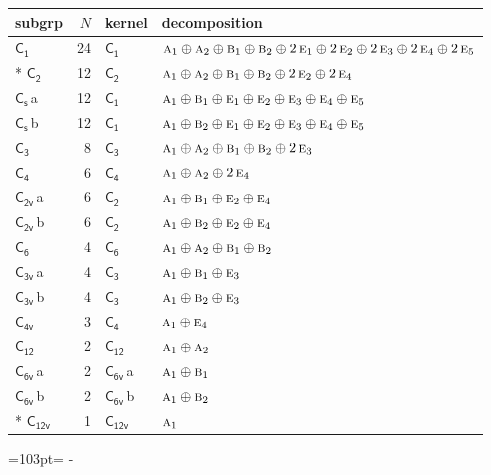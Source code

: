 \documentclass[10pt,a4paper]{article}
\newcommand{\needspace}[1]{\par\penalty-100\begingroup\dimen0=#1\relax\dimen2=\pagegoal
  \advance\dimen2-\pagetotal\ifdim\dimen0>\dimen2\relax\ifdim\dimen2>0pt\vfil\break\fi\fi
  \endgroup}
\numberwithin{equation}{section}
\newcommand{\grp}[1]{\mathsf{#1}}
\newcommand{\irr}[1]{\text{\normalfont\scshape #1}}
\newcommand{\clsletter}[1]{\,{\scriptsize\color{black!55}#1}}
\newlength{\fillwidth}\newlength{\cellwidth}\newlength{\colwidth}
\begin{document}
{\begin{longtable}{@{}lrl>{\RaggedRight\arraybackslash}p{\fillwidth}@{}}
subgrp & $N$ & kernel & decomposition\\\midrule\endhead
\bottomrule\endfoot\endlastfoot
\href{C1.pdf}{$\grp{C_{1}}$} & 24 & \href{C1.pdf}{$\grp{C_{1}}$} & $\irr{a}_{1}\oplus \irr{a}_{2}\oplus \irr{b}_{1}\oplus \irr{b}_{2}\oplus 2\,\irr{e}_{1}\oplus 2\,\irr{e}_{2}\oplus 2\,\irr{e}_{3}\oplus 2\,\irr{e}_{4}\oplus 2\,\irr{e}_{5}$\\*
\href{C2.pdf}{$\grp{C_{2}}$} & 12 & \href{C2.pdf}{$\grp{C_{2}}$} & $\irr{a}_{1}\oplus \irr{a}_{2}\oplus \irr{b}_{1}\oplus \irr{b}_{2}\oplus 2\,\irr{e}_{2}\oplus 2\,\irr{e}_{4}$\\
\href{C1v.pdf}{$\grp{C_{s}}$}\clsletter{a} & 12 & \href{C1.pdf}{$\grp{C_{1}}$} & $\irr{a}_{1}\oplus \irr{b}_{1}\oplus \irr{e}_{1}\oplus \irr{e}_{2}\oplus \irr{e}_{3}\oplus \irr{e}_{4}\oplus \irr{e}_{5}$\\
\href{C1v.pdf}{$\grp{C_{s}}$}\clsletter{b} & 12 & \href{C1.pdf}{$\grp{C_{1}}$} & $\irr{a}_{1}\oplus \irr{b}_{2}\oplus \irr{e}_{1}\oplus \irr{e}_{2}\oplus \irr{e}_{3}\oplus \irr{e}_{4}\oplus \irr{e}_{5}$\\
\href{C3.pdf}{$\grp{C_{3}}$} & 8 & \href{C3.pdf}{$\grp{C_{3}}$} & $\irr{a}_{1}\oplus \irr{a}_{2}\oplus \irr{b}_{1}\oplus \irr{b}_{2}\oplus 2\,\irr{e}_{3}$\\
\href{C4.pdf}{$\grp{C_{4}}$} & 6 & \href{C4.pdf}{$\grp{C_{4}}$} & $\irr{a}_{1}\oplus \irr{a}_{2}\oplus 2\,\irr{e}_{4}$\\
\href{C2v.pdf}{$\grp{C_{2v}}$}\clsletter{a} & 6 & \href{C2.pdf}{$\grp{C_{2}}$} & $\irr{a}_{1}\oplus \irr{b}_{1}\oplus \irr{e}_{2}\oplus \irr{e}_{4}$\\
\href{C2v.pdf}{$\grp{C_{2v}}$}\clsletter{b} & 6 & \href{C2.pdf}{$\grp{C_{2}}$} & $\irr{a}_{1}\oplus \irr{b}_{2}\oplus \irr{e}_{2}\oplus \irr{e}_{4}$\\
\href{C6.pdf}{$\grp{C_{6}}$} & 4 & \href{C6.pdf}{$\grp{C_{6}}$} & $\irr{a}_{1}\oplus \irr{a}_{2}\oplus \irr{b}_{1}\oplus \irr{b}_{2}$\\
\href{C3v.pdf}{$\grp{C_{3v}}$}\clsletter{a} & 4 & \href{C3.pdf}{$\grp{C_{3}}$} & $\irr{a}_{1}\oplus \irr{b}_{1}\oplus \irr{e}_{3}$\\
\href{C3v.pdf}{$\grp{C_{3v}}$}\clsletter{b} & 4 & \href{C3.pdf}{$\grp{C_{3}}$} & $\irr{a}_{1}\oplus \irr{b}_{2}\oplus \irr{e}_{3}$\\
\href{C4v.pdf}{$\grp{C_{4v}}$} & 3 & \href{C4.pdf}{$\grp{C_{4}}$} & $\irr{a}_{1}\oplus \irr{e}_{4}$\\
\href{C12.pdf}{$\grp{C_{12}}$} & 2 & \href{C12.pdf}{$\grp{C_{12}}$} & $\irr{a}_{1}\oplus \irr{a}_{2}$\\
\href{C6v.pdf}{$\grp{C_{6v}}$}\clsletter{a} & 2 & \href{C6v.pdf}{$\grp{C_{6v}}$}\clsletter{a} & $\irr{a}_{1}\oplus \irr{b}_{1}$\\
\href{C6v.pdf}{$\grp{C_{6v}}$}\clsletter{b} & 2 & \href{C6v.pdf}{$\grp{C_{6v}}$}\clsletter{b} & $\irr{a}_{1}\oplus \irr{b}_{2}$\\*
\href{C12v.pdf}{$\grp{C_{12v}}$} & 1 & \href{C12v.pdf}{$\grp{C_{12v}}$} & $\irr{a}_{1}$\\
\bottomrule\end{longtable}}
\needspace{103pt}
\end{document}
